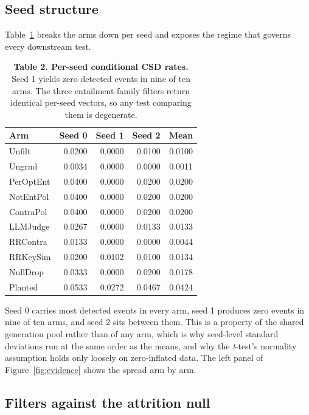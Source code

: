 \documentclass[11pt]{article}
\begin{document}
\subsection{Seed structure}

Table~\ref{tab:2} breaks the arms down per seed and exposes the regime that governs every downstream test.

\begin{table}[t]
\centering
\small
\begin{tabular}{lrrrr}
\toprule
\textbf{Arm} & \textbf{Seed 0} & \textbf{Seed 1} & \textbf{Seed 2} & \textbf{Mean} \\
\midrule
Unfilt & 0.0200 & 0.0000 & 0.0100 & 0.0100 \\
Ungrnd & 0.0034 & 0.0000 & 0.0000 & 0.0011 \\
PerOptEnt & 0.0400 & 0.0000 & 0.0200 & 0.0200 \\
NotEntPol & 0.0400 & 0.0000 & 0.0200 & 0.0200 \\
ContraPol & 0.0400 & 0.0000 & 0.0200 & 0.0200 \\
LLMJudge & 0.0267 & 0.0000 & 0.0133 & 0.0133 \\
RRContra & 0.0133 & 0.0000 & 0.0000 & 0.0044 \\
RRKeySim & 0.0200 & 0.0102 & 0.0100 & 0.0134 \\
NullDrop & 0.0333 & 0.0000 & 0.0200 & 0.0178 \\
Planted & 0.0533 & 0.0272 & 0.0467 & 0.0424 \\
\bottomrule
\end{tabular}
\caption{\textbf{Table 2. Per-seed conditional CSD rates.} Seed 1 yields zero detected events in nine of ten arms. The three entailment-family filters return identical per-seed vectors, so any test comparing them is degenerate.}
\label{tab:2}
\end{table}

Seed 0 carries most detected events in every arm, seed 1 produces zero events in nine of ten arms, and seed 2 sits between them. This is a property of the shared generation pool rather than of any arm, which is why seed-level standard deviations run at the same order as the means, and why the \emph{t}-test's normality assumption holds only loosely on zero-inflated data. The left panel of Figure~\ref{fig:evidence} shows the spread arm by arm.

\subsection{Filters against the attrition null}
\end{document}
